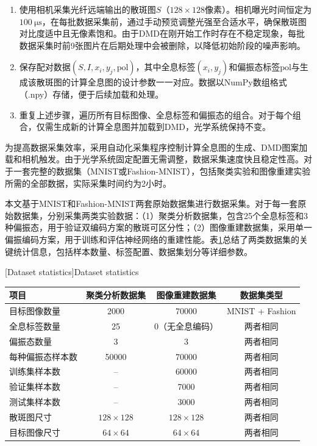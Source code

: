 {\begin{enumerate}
    \item 使用相机采集光纤远端输出的散斑图$S$（$128\times128$像素）。相机曝光时间恒定为$100~\mathrm{μs}$，在每批数据采集前，通过手动预览调整光强至合适水平，确保散斑图对比度适中且无像素饱和。由于DMD在刚开始工作时存在不稳定现象，每批数据采集时前9张图片在后期处理中会被删除，以降低初始阶段的噪声影响。
    
    \item 保存配对数据$(S, I, x_i, y_j, \text{pol})$，其中全息标签$(x_i, y_j)$和偏振态标签$\text{pol}$与生成该散斑图的计算全息图的设计参数一一对应。数据以NumPy数组格式（.npy）存储，便于后续加载和处理。
    
    \item 重复上述步骤，遍历所有目标图像、全息标签和偏振态的组合。对于每个组合，仅需生成新的计算全息图并加载到DMD，光学系统保持不变。
\end{enumerate}

为提高数据采集效率，采用自动化采集程序控制计算全息图的生成、DMD图案加载和相机触发。由于光学系统固定配置无需调整，数据采集速度快且稳定性高。对于一套完整的数据集（MNIST或Fashion-MNIST），包括聚类实验和图像重建实验所需的全部数据，实际采集时间约为2小时。

本文基于MNIST和Fashion-MNIST两套原始数据集进行数据采集。对于每一套原始数据集，分别采集两类实验数据：（1）聚类分析数据集，包含25个全息标签和3种偏振态，用于验证双编码方案的散斑可区分性；（2）图像重建数据集，采用单一偏振编码方案，用于训练和评估神经网络的重建性能。表\ref{tab:dataset_stats}总结了两类数据集的关键统计信息，包括样本数量、标签配置、数据集划分等详细参数。

\begin{table}[!htbp]
    \centering
    [Dataset statistics]{\enspace Dataset statistics}
    \label{tab:dataset_stats}
    \footnotesize
    \setlength{\tabcolsep}{6pt}
    \renewcommand{\arraystretch}{1.2}
    \begin{tabular}{lccc}
        \hline
        项目 & 聚类分析数据集 & 图像重建数据集 & 数据集类型 \\
        \hline
        目标图像数量 & 2000 & 70000 & MNIST + Fashion \\
        全息标签数量 & 25 & 0（无全息编码） & 两者相同 \\
        偏振态数量 & 3 & 3 & 两者相同 \\
        每种偏振态样本数 & 50000 & 70000 & 两者相同 \\
        训练集样本数 & -- & 60000 & 两者相同 \\
        验证集样本数 & -- & 7000 & 两者相同 \\
        测试集样本数 & -- & 3000 & 两者相同 \\
        散斑图尺寸 & $128\times128$ & $128\times128$ & 两者相同 \\
        目标图像尺寸 & $64\times64$ & $64\times64$ & 两者相同 \\
        \hline
    \end{tabular}
\end{table}

}
